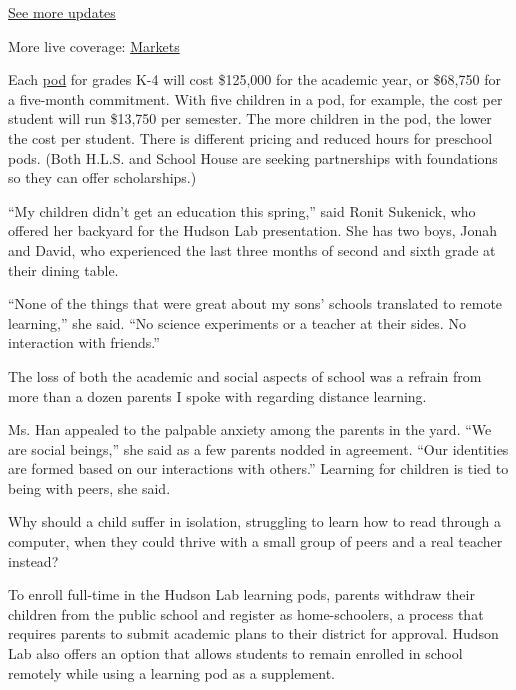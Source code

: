 \href{https://www.nytimes.com/2020/08/01/world/coronavirus-covid-19.html?action=click\&pgtype=Article\&state=default\&region=MAIN_CONTENT_1\&context=storylines_live_updates}{See
more updates}

More live coverage:
\href{https://www.nytimes.com/live/2020/07/31/business/stock-market-today-coronavirus?action=click\&pgtype=Article\&state=default\&region=MAIN_CONTENT_1\&context=storylines_live_updates}{Markets}

Each \href{https://www.learning-pods.com/}{pod} for grades K-4 will cost
\$125,000 for the academic year, or \$68,750 for a five-month
commitment. With five children in a pod, for example, the cost per
student will run \$13,750 per semester. The more children in the pod,
the lower the cost per student. There is different pricing and reduced
hours for preschool pods. (Both H.L.S. and School House are seeking
partnerships with foundations so they can offer scholarships.)

``My children didn't get an education this spring,'' said Ronit
Sukenick, who offered her backyard for the Hudson Lab presentation. She
has two boys, Jonah and David, who experienced the last three months of
second and sixth grade at their dining table.

``None of the things that were great about my sons' schools translated
to remote learning,'' she said. ``No science experiments or a teacher at
their sides. No interaction with friends.''

The loss of both the academic and social aspects of school was a refrain
from more than a dozen parents I spoke with regarding distance learning.

Ms. Han appealed to the palpable anxiety among the parents in the yard.
``We are social beings,'' she said as a few parents nodded in agreement.
``Our identities are formed based on our interactions with others.''
Learning for children is tied to being with peers, she said.

Why should a child suffer in isolation, struggling to learn how to read
through a computer, when they could thrive with a small group of peers
and a real teacher instead?

To enroll full-time in the Hudson Lab learning pods, parents withdraw
their children from the public school and register as home-schoolers, a
process that requires parents to submit academic plans to their district
for approval. Hudson Lab also offers an option that allows students to
remain enrolled in school remotely while using a learning pod as a
supplement.

